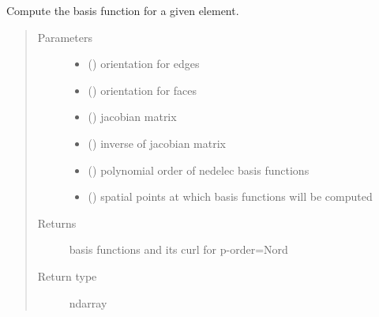 \documentclass[letterpaper,10pt,english]{sphinxmanual}
\begin{document}
\begin{fulllineitems}
\label{\detokenize{petgem/hvfem:petgem.hvfem.computeBasisFunctions}}
Compute the basis function for a given element.
\begin{quote}\begin{description}
\item[{Parameters}] \leavevmode\begin{itemize}
\item {} 
 () \textendash{} orientation for edges

\item {} 
 () \textendash{} orientation for faces

\item {} 
 () \textendash{} jacobian matrix

\item {} 
 () \textendash{} inverse of jacobian matrix

\item {} 
 () \textendash{} polynomial order of nedelec basis functions

\item {} 
 () \textendash{} spatial points at which basis functions will be computed

\end{itemize}

\item[{Returns}] \leavevmode
basis functions and its curl for p-order=Nord

\item[{Return type}] \leavevmode
ndarray

\end{description}\end{quote}

\end{fulllineitems}
\end{document}
